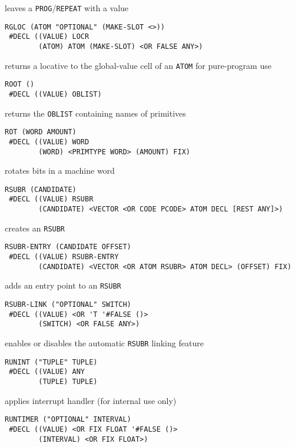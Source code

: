 \documentclass[a4paper,]{article}
\begin{document}
leaves a \texttt{PROG}/\texttt{REPEAT} with a value

\begin{verbatim}
RGLOC (ATOM "OPTIONAL" (MAKE-SLOT <>))
 #DECL ((VALUE) LOCR
        (ATOM) ATOM (MAKE-SLOT) <OR FALSE ANY>)
\end{verbatim}

returns a locative to the global-value cell of an \texttt{ATOM} for pure-program use

\begin{verbatim}
ROOT ()
 #DECL ((VALUE) OBLIST)
\end{verbatim}

returns the \texttt{OBLIST} containing names of primitives

\begin{verbatim}
ROT (WORD AMOUNT)
 #DECL ((VALUE) WORD
        (WORD) <PRIMTYPE WORD> (AMOUNT) FIX)
\end{verbatim}

rotates bits in a machine word

\begin{verbatim}
RSUBR (CANDIDATE)
 #DECL ((VALUE) RSUBR
        (CANDIDATE) <VECTOR <OR CODE PCODE> ATOM DECL [REST ANY]>)
\end{verbatim}

creates an \texttt{RSUBR}

\begin{verbatim}
RSUBR-ENTRY (CANDIDATE OFFSET)
 #DECL ((VALUE) RSUBR-ENTRY
        (CANDIDATE) <VECTOR <OR ATOM RSUBR> ATOM DECL> (OFFSET) FIX)
\end{verbatim}

adds an entry point to an \texttt{RSUBR}

\begin{verbatim}
RSUBR-LINK ("OPTIONAL" SWITCH)
 #DECL ((VALUE) <OR 'T '#FALSE ()>
        (SWITCH) <OR FALSE ANY>)
\end{verbatim}

enables or disables the automatic \texttt{RSUBR} linking feature

\begin{verbatim}
RUNINT ("TUPLE" TUPLE)
 #DECL ((VALUE) ANY
        (TUPLE) TUPLE)
\end{verbatim}

applies interrupt handler (for internal use only)

\begin{verbatim}
RUNTIMER ("OPTIONAL" INTERVAL)
 #DECL ((VALUE) <OR FIX FLOAT '#FALSE ()>
        (INTERVAL) <OR FIX FLOAT>)
\end{verbatim}
\end{document}
